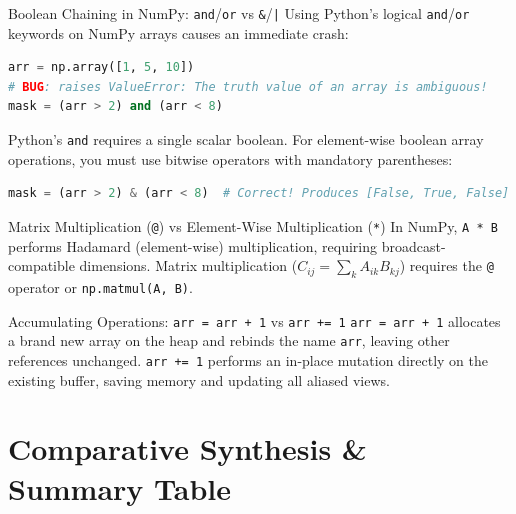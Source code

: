\begin{trapbox}{Boolean Chaining in NumPy: \texttt{and}/\texttt{or} vs \texttt{\&}/\texttt{|}}
Using Python's logical \texttt{and}/\texttt{or} keywords on NumPy arrays causes an immediate crash:
\begin{lstlisting}[language=Python]
arr = np.array([1, 5, 10])
# BUG: raises ValueError: The truth value of an array is ambiguous!
mask = (arr > 2) and (arr < 8)
\end{lstlisting}
Python's \texttt{and} requires a single scalar boolean. For element-wise boolean array operations, you must use bitwise operators with mandatory parentheses:
\begin{lstlisting}[language=Python]
mask = (arr > 2) & (arr < 8)  # Correct! Produces [False, True, False]
\end{lstlisting}
\end{trapbox}

\begin{trapbox}{Matrix Multiplication (\texttt{@}) vs Element-Wise Multiplication (\texttt{*})}
In NumPy, \texttt{A * B} performs Hadamard (element-wise) multiplication, requiring broadcast-compatible dimensions. Matrix multiplication ($C_{ij} = \sum_k A_{ik} B_{kj}$) requires the \texttt{@} operator or \texttt{np.matmul(A, B)}.
\end{trapbox}

\begin{trapbox}{Accumulating Operations: \texttt{arr = arr + 1} vs \texttt{arr += 1}}
\texttt{arr = arr + 1} allocates a brand new array on the heap and rebinds the name \texttt{arr}, leaving other references unchanged.
\texttt{arr += 1} performs an in-place mutation directly on the existing buffer, saving memory and updating all aliased views.
\end{trapbox}

\section{Comparative Synthesis \& Summary Table}

